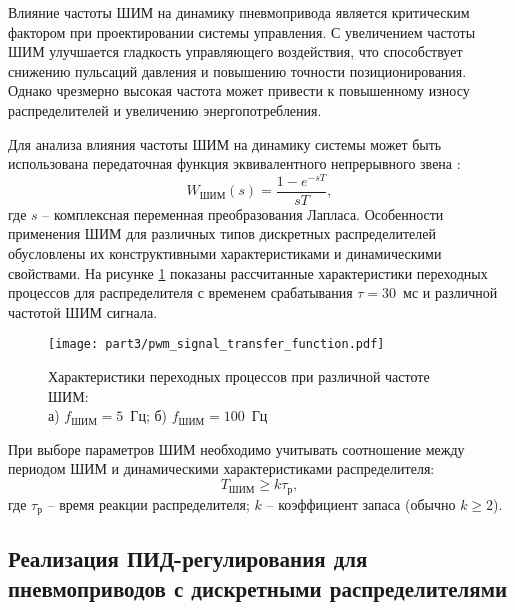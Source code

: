 Влияние частоты ШИМ на динамику пневмопривода является критическим фактором при
проектировании системы управления. С увеличением частоты ШИМ улучшается
гладкость управляющего воздействия, что способствует снижению пульсаций давления
и повышению точности позиционирования. Однако чрезмерно высокая частота может привести
к повышенному износу распределителей и увеличению энергопотребления.

Для анализа влияния частоты ШИМ на динамику системы может быть использована передаточная функция эквивалентного непрерывного звена \cite{pwm_transfer}:
\begin{equation}
	W_{\text{ШИМ}}(s) = \frac{1 - e^{-sT}}{sT},
\end{equation}
где $s$ -- комплексная переменная преобразования Лапласа.
Особенности применения ШИМ для различных типов дискретных
распределителей обусловлены их конструктивными характеристиками и
динамическими свойствами. На рисунке \ref{fig:ch3:pwm_valve_response} показаны рассчитанные
характеристики переходных процессов для распределителя с временем срабатывания $\tau = 30$~мс и различной
частотой ШИМ сигнала.

\begin{figure}[ht]
	\centering
	\texttt{[image: part3/pwm\_signal\_transfer\_function.pdf]}
	\caption{Характеристики переходных процессов при различной частоте ШИМ:\\
		а) $f_{\text{ШИМ}} = \num{5}$~Гц; б) $f_{\text{ШИМ}} = \num{100}$~Гц
	}
	\label{fig:ch3:pwm_valve_response}
\end{figure}

При выборе параметров ШИМ необходимо учитывать соотношение между
периодом ШИМ и динамическими характеристиками распределителя:
\begin{equation}
	T_{ШИМ} \geq k\tau_{\text{р}},
\end{equation}
где $\tau_{\text{р}}$ -- время реакции распределителя;
$k$ -- коэффициент запаса (обычно $k \geq 2$).

\subsection*{Реализация ПИД-регулирования для пневмоприводов с дискретными распределителями}\label{subsec:ch3/sec2/sub2}

